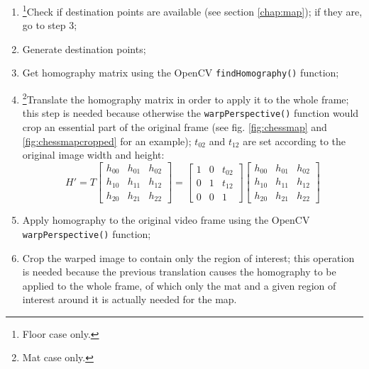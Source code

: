 \documentclass[12pt]{article}
\begin{document}
\begin{enumerate}
\item \footnote{Floor case only.}Check if destination points are available (see section \ref{chap:map}); if they are, go to step 3;
\item Generate destination points;
\item Get homography matrix using the OpenCV \lstinline{findHomography()} function;
\item \footnote{Mat case only.\label{matnote}}Translate the homography matrix in order to apply it to the whole frame; this step is needed because otherwise the \lstinline{warpPerspective()} function would crop an essential part of the original frame\cite{cvcrop} (see fig. \ref{fig:chessmap} and \ref{fig:chessmapcropped} for an example); $t_{02}$ and $t_{12}$ are set according to the original image width and height:
\begin{equation}
    H' = T
    \begin{bmatrix}
    h_{00} & h_{01} & h_{02} \\
    h_{10} & h_{11} & h_{12} \\
    h_{20} & h_{21} & h_{22}
    \end{bmatrix}
    =
    \begin{bmatrix}
    1 & 0 & t_{02} \\
    0 & 1 & t_{12} \\
    0 & 0 & 1
    \end{bmatrix}
    \begin{bmatrix}
    h_{00} & h_{01} & h_{02} \\
    h_{10} & h_{11} & h_{12} \\
    h_{20} & h_{21} & h_{22}
    \end{bmatrix}
\end{equation}
\item Apply homography to the original video frame using the OpenCV \lstinline{warpPerspective()} function;
\item {}Crop the warped image to contain only the region of interest; this operation is needed because the previous translation causes the homography to be applied to the whole frame, of which only the mat and a given region of interest around it is actually needed for the map.
\end{enumerate}
\end{document}
